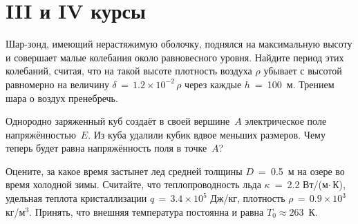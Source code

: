 \section{III и IV курсы}

\AddProb Шар-зонд, имеющий нерастяжимую оболочку, поднялся на максимальную высоту и совершает малые колебания около равновесного уровня. 
Найдите период этих колебаний, считая, что на такой высоте плотность воздуха $\rho$ убывает с высотой равномерно на величину 
$\delta\,=\,1.2\times10^{-2}\,\rho$ через каждые $h$~=~100~м. Трением шара о воздух пренебречь.

\AddProb Однородно заряженный куб создаёт в своей вершине~$A$ электрическое поле напряжённостью~$E$. Из куба удалили кубик вдвое 
меньших размеров. Чему теперь будет равна напряжённость поля в точке~$A$?

\AddProb Оцените, за какое время застынет лед средней толщины $D$~=~0.5~м на озере во время холодной зимы. Считайте, что теплопроводность льда 
$\kappa$~=~2.2 Вт/(м$\cdot\,$К), удельная теплота кристаллизации $q\,=\,3.4\times10^5$ Дж/кг, плотность $\rho\,=\, 0.9\times10^3$ кг/м$^3$. 
Принять, что внешняя температура постоянна и равна $T_0\approx263$~К. 